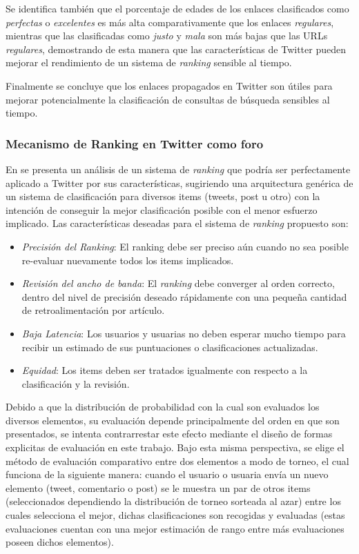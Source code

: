 	Se identifica también que el porcentaje de edades de los enlaces clasificados como \emph{perfectas} o \emph{excelentes} es más alta comparativamente que los enlaces \emph{regulares}, mientras que las clasificadas como \emph{justo} y \emph{mala} son más bajas que las URLs \emph{regulares}, demostrando de esta manera que las características de Twitter pueden mejorar el rendimiento de un sistema de \emph{ranking} sensible al tiempo.  
	
	Finalmente se concluye que los enlaces propagados en Twitter son útiles para mejorar potencialmente la clasificación de consultas de búsqueda sensibles al tiempo.
	
\subsubsection{Mecanismo de Ranking en Twitter como foro}

	 En \cite{DasSarma:2010:RMT:1718487.1718491} se presenta un análisis de un sistema de \emph{ranking} que podría ser perfectamente aplicado a Twitter por sus características, sugiriendo una arquitectura genérica de un sistema de clasificación para diversos items (tweets, post u otro) con la intención de conseguir la mejor clasificación posible con el menor esfuerzo implicado. Las características deseadas para el sistema de \emph{ranking} propuesto son:

	\begin{itemize}
		\item \emph{Precisión del Ranking}: El ranking debe ser preciso aún cuando no sea posible re-evaluar nuevamente todos los items implicados.
		
		\item \emph{Revisión del ancho de banda}: El \emph{ranking} debe converger al orden correcto, dentro del nivel de precisión deseado rápidamente con una pequeña cantidad de retroalimentación por artículo.
		
		\item \emph{Baja Latencia}: Los usuarios y usuarias no deben esperar mucho tiempo para recibir un estimado de sus puntuaciones o clasificaciones actualizadas.
		
		\item \emph{Equidad}: Los items deben ser tratados igualmente con respecto a la clasificación y la revisión.
	\end{itemize}

	Debido a que la distribución de probabilidad con la cual son evaluados los diversos elementos, su evaluación depende principalmente del orden en que son presentados, se intenta contrarrestar este efecto mediante el diseño de formas explicitas de evaluación en este trabajo. Bajo esta misma perspectiva, se elige
	el método de evaluación comparativo entre dos elementos a modo de torneo, el cual funciona de la siguiente manera: cuando el usuario o usuaria envía un nuevo elemento (tweet, comentario o post) se le muestra un par de otros items (seleccionados dependiendo la distribución de torneo sorteada al azar) entre los cuales selecciona el mejor, dichas clasificaciones son recogidas y evaluadas (estas evaluaciones cuentan con una mejor estimación de rango entre más evaluaciones poseen dichos elementos).
	
